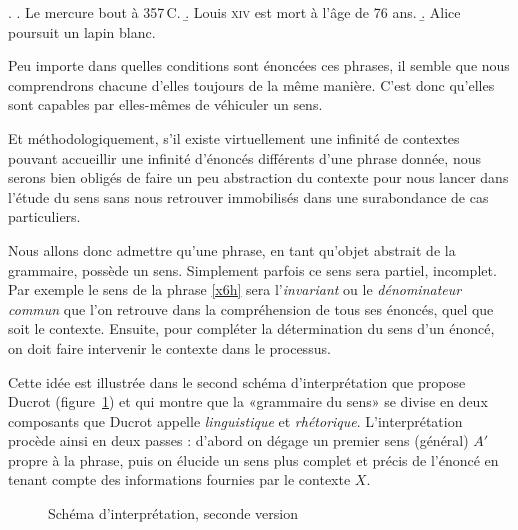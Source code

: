 \begin{refsegment}
\ex.  \label{x:357deg}
\a. Le mercure bout à 357\,\degres C.
\b. Louis \textsc{xiv} est mort à l'âge de 76 ans.
\b. Alice poursuit un lapin blanc.

Peu importe dans quelles conditions sont énoncées ces phrases, il semble que nous comprendrons chacune d'elles toujours de la même manière.
C'est donc qu'elles sont capables par elles-mêmes de véhiculer un sens.

\largerpage[-1]
Et méthodologiquement, s'il existe virtuellement une infinité de contextes pouvant accueillir une infinité d'énoncés différents d'une phrase donnée, nous serons bien obligés de faire un peu abstraction du contexte pour nous lancer dans l'étude du sens sans nous retrouver immobilisés dans une surabondance de cas particuliers. 

Nous allons donc admettre qu'une phrase, en tant qu'objet abstrait de la grammaire, possède un sens. 
Simplement parfois ce sens sera partiel, incomplet. Par exemple le sens de la phrase \ref{x6h} sera l'\emph{invariant} ou le \emph{dénominateur commun} que l'on retrouve dans la compréhension de tous ses énoncés, quel que soit le contexte. 
Ensuite, pour compléter la détermination du sens d'un énoncé, on doit faire intervenir le contexte dans le processus. 


Cette idée est illustrée dans le second schéma d'interprétation que propose Ducrot
(figure~\ref{schemaDucrot2}) et qui montre que la «grammaire du sens» se divise en deux composants que Ducrot appelle \emph{linguistique} et \emph{rhétorique}.
L'interprétation procède ainsi en deux passes : d'abord on dégage un premier sens (général) $A'$ propre à la phrase, puis on élucide un sens plus complet et précis de l'énoncé en tenant compte des informations fournies par le contexte $X$. 


 \begin{figure}[h]
 \begin{center}
 \end{center}
\caption{Schéma d'interprétation, seconde version \citep{Ducrot:84}}\label{schemaDucrot2}
 \end{figure}



\end{refsegment}
